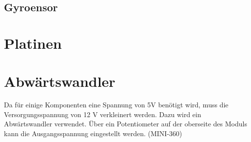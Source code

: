 \subsection{Gyroensor}






\section{Platinen}



\section{Abwärtswandler}

Da für einige Komponenten eine Spannung von 5V benötigt wird, muss die Versorgungsspannung von 12 V verkleinert werden. Dazu wird ein Abwärtswandler verwendet. Über ein Potentiometer auf der oberseite des Moduls kann die Ausgangsspannung eingestellt werden. (MINI-360)






